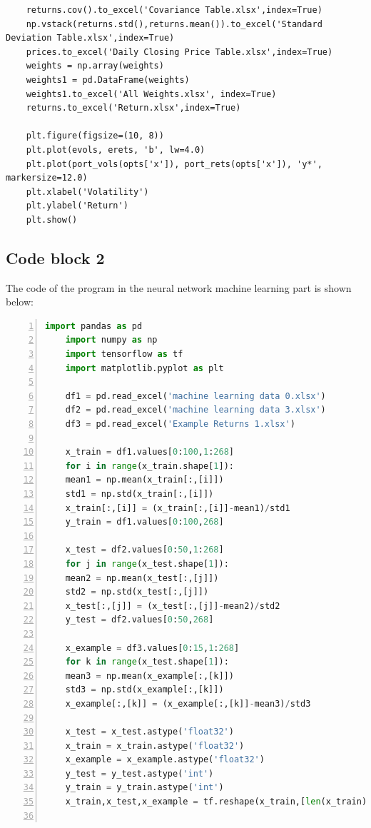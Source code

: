 \documentclass[default,iicol]{sn-jnl}%
\begin{document}
\begin{appendices}
\begin{lstlisting}
	returns.cov().to_excel('Covariance Table.xlsx',index=True)
	np.vstack(returns.std(),returns.mean()).to_excel('Standard Deviation Table.xlsx',index=True)
	prices.to_excel('Daily Closing Price Table.xlsx',index=True)
	weights = np.array(weights)
	weights1 = pd.DataFrame(weights)
	weights1.to_excel('All Weights.xlsx', index=True)
	returns.to_excel('Return.xlsx',index=True)
	
	plt.figure(figsize=(10, 8))
	plt.plot(evols, erets, 'b', lw=4.0)
	plt.plot(port_vols(opts['x']), port_rets(opts['x']), 'y*', markersize=12.0)
	plt.xlabel('Volatility')
	plt.ylabel('Return')
	plt.show()
\end{lstlisting}
\clearpage
\subsection{Code block 2}\label{secA3sub2}
The code of the program in the neural network machine learning part is shown below:
\begin{lstlisting}[language=Python,numbers=left, 
	numberstyle= \tiny, 
	keywordstyle= \color{ blue!70},
	commentstyle= \color{red!50!green!50!blue!50}, 
	frame=shadowbox, % 阴影效果
	rulesepcolor= \color{ red!20!green!20!blue!20} ,
	escapeinside=``, % 英文分号中可写入中文
	xleftmargin=2em,xrightmargin=2em, aboveskip=1em,
	framexleftmargin=2em]
	import pandas as pd
	import numpy as np
	import tensorflow as tf
	import matplotlib.pyplot as plt
	
	df1 = pd.read_excel('machine learning data 0.xlsx')
	df2 = pd.read_excel('machine learning data 3.xlsx')
	df3 = pd.read_excel('Example Returns 1.xlsx')
	
	x_train = df1.values[0:100,1:268]
	for i in range(x_train.shape[1]):
	mean1 = np.mean(x_train[:,[i]])
	std1 = np.std(x_train[:,[i]])
	x_train[:,[i]] = (x_train[:,[i]]-mean1)/std1
	y_train = df1.values[0:100,268]
	
	x_test = df2.values[0:50,1:268]
	for j in range(x_test.shape[1]):
	mean2 = np.mean(x_test[:,[j]])
	std2 = np.std(x_test[:,[j]])
	x_test[:,[j]] = (x_test[:,[j]]-mean2)/std2
	y_test = df2.values[0:50,268]
	
	x_example = df3.values[0:15,1:268]
	for k in range(x_test.shape[1]):
	mean3 = np.mean(x_example[:,[k]])
	std3 = np.std(x_example[:,[k]])
	x_example[:,[k]] = (x_example[:,[k]]-mean3)/std3
	
	x_test = x_test.astype('float32')
	x_train = x_train.astype('float32')
	x_example = x_example.astype('float32')
	y_test = y_test.astype('int')
	y_train = y_train.astype('int')
	x_train,x_test,x_example = tf.reshape(x_train,[len(x_train),267,-1]),tf.reshape(x_test,[len(x_test),267,-1]),tf.reshape(x_example,[len(x_example),267,-1])
	

\end{lstlisting}
\end{appendices}
\end{document}

